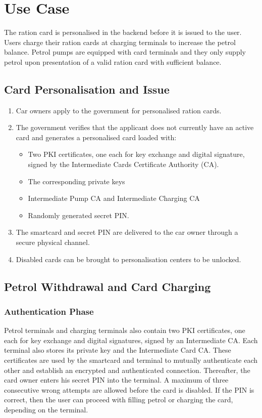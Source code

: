 \documentclass[a4paper,10pt]{llncs}
\begin{document}
\section{Use Case}
The ration card is personalised in the backend before it is issued to the user. Users charge their ration cards at charging terminals to increase the petrol balance. Petrol pumps are equipped with card terminals and they only supply petrol upon presentation of a valid ration card with sufficient balance.

\subsection{Card Personalisation and Issue}
\label{personalisation}
\begin{enumerate}
  \item Car owners apply to the government for personalised ration cards.
  \item The government verifies that the applicant does not currently have an active card and generates a personalised card loaded with:
	\begin{itemize}
	  \item Two PKI certificates, one each for key exchange and digital signature, signed by the Intermediate Cards Certificate Authority (CA).
	  \item The corresponding private keys
	  \item Intermediate Pump CA and Intermediate Charging CA
	  \item Randomly generated secret PIN.
	\end{itemize}
  \item The smartcard and secret PIN are delivered to the car owner through a secure physical channel.
  \item Disabled cards can be brought to personalisation centers to be unlocked.
\end{enumerate}

\subsection{Petrol Withdrawal and Card Charging}
\subsubsection{Authentication Phase}
Petrol terminals and charging terminals also contain two PKI certificates, one each for key exchange and digital signatures, signed by an Intermediate CA. Each terminal also stores its private key and the Intermediate Card CA. These certificates are used by the smartcard and terminal to mutually authenticate each other and establish an encrypted and authenticated connection. Thereafter, the card owner enters his secret PIN into the terminal. A maximum of three consecutive wrong attempts are allowed before the card is disabled. If the PIN is correct, then the user can proceed with filling petrol or charging the card, depending on the terminal.
\end{document}
